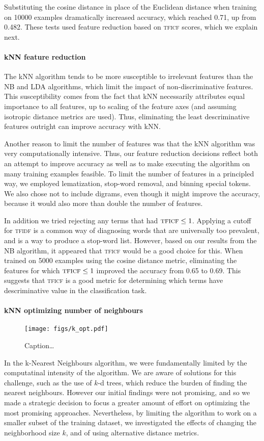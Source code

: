 \documentclass[conference,letterpaper]{IEEEtran}
\begin{document}
Substituting the cosine distance in place of the Euclidean distance when 
training on 10000 examples dramatically increased accuracy, which reached 0.71,
up from 0.482.  These tests used feature reduction based on \textsc{tficf} 
scores, which we explain next.

\paragraph*{kNN feature reduction}
The kNN algorithm tends to be more susceptible to irrelevant
features than the NB and LDA algorithms, which limit the impact of 
non-discriminative features.
This susceptibility comes from the fact that kNN necessarily attributes equal 
importance to all features, up to scaling of the feature axes 
(and assuming isotropic distance metrics are used).  Thus, eliminating the
least descriminative features outright can improve accuracy with kNN.

Another reason to limit the number of features was that the kNN algorithm was
very computationally intensive.  Thus, our feature reduction decisions reflect
both an attempt to improve accuracy as well as to make executing the algorithm
on many training examples feasible.
To limit the number of features in a principled way, we employed lematization, 
stop-word removal, and binning special tokens.  We also chose not to include
digrams, even though it might improve the accuracy, because it would also more 
than double the number of features.

In addition we tried rejecting any terms that had $\textsc{tficf} \leq 1$.  
Applying a cutoff for \textsc{tfidf} is a common
way of diagnosing words that are universally too prevalent, and is a way to
produce a stop-word list.  However, based on our results from the NB algorithm,
it appeared that \textsc{tficf} would be a good choice for this.  When
trained on 5000 examples using the cosine distance metric, eliminating 
the features for which $\textsc{tficf}\leq 1$ improved the accuracy from 0.65
to 0.69.  This suggests that \textsc{tficf} is a good metric for determining
which terms have descriminative value in the classification task.

\paragraph*{kNN optimizing number of neighbours}
\begin{figure}
	\centering
	\texttt{[image: figs/k\_opt.pdf]}
	\caption{Caption\dots}
	\label{fig:k_opt}
\end{figure}
In the k-Nearest Neighbours algorithm, we were fundamentally limited by 
the computatinal intensity of the algorithm.  We are aware of solutions for
this challenge, such as the use of $k$-d trees, which reduce the burden of
finding the nearest neighbours.  However our initial findings were not 
promising, and so we made a strategic decision to focus a greater amount of
effort on optimizing the most promising approaches.  Nevertheless, by limiting
the algorithm to work on a smaller subset of the training dataset, we 
investigated the effects of changing the neighborhood size $k$, and of using
alternative distance metrics.
\end{document}
